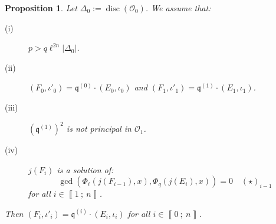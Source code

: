 \documentclass[a4paper,10pt]{report}
\theoremstyle{definition}
\theoremstyle{plain}
\newtheorem{Proposition}[Definition]{Proposition}
\theoremstyle{definition}
\newcommand{\mO}{\mathcal{O}}
\renewcommand{\i}[2]{\left\llbracket #1~;~#2\right\rrbracket}
\renewcommand{\(}{\left(}
\renewcommand{\)}{\right)}
\newcommand{\mf}[1]{\mathfrak{#1}}
\newcommand{\mfq}{\mathfrak{q}}
\DeclareMathOperator{\disc}{disc}
\begin{document}
\begin{Proposition}\label{Proposition 9}
Let $\Delta_0:=\disc(\mO_0)$. We assume that:
\begin{description}
\item[(i)] $p>q\ell^{2n}|\Delta_0|$.
\item[(ii)] $(F_0,\iota'_0)=\mf{q}^{(0)}\cdot(E_{0},\iota_0)$ and $(F_1,\iota'_1)=\mf{q}^{(1)}\cdot(E_{1},\iota_1)$.
\item[(iii)] $(\mfq^{(1)})^2$ is not principal in $\mO_1$.
\item[(iv)] $j(F_{i})$ is a solution of: 
\[\gcd(\Phi_\ell(j(F_{i-1}),x),\Phi_q(j(E_{i}),x))=0 \quad (\star)_{i-1}\] 
for all $i\in\i{1}{n}$. 
\end{description}
Then $(F_{i},\iota'_{i})=\mf{q}^{(i)}\cdot(E_{i},\iota_i)$ for all $i\in\i{0}{n}$.  
\end{Proposition}
\end{document}
